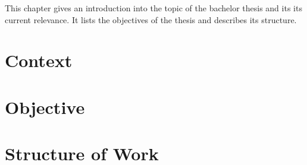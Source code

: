 This chapter gives an introduction into the topic of the bachelor thesis and its its current relevance. It lists the objectives of the thesis and describes its structure.

\section{Context}


\section{Objective}


\section{Structure of Work}

